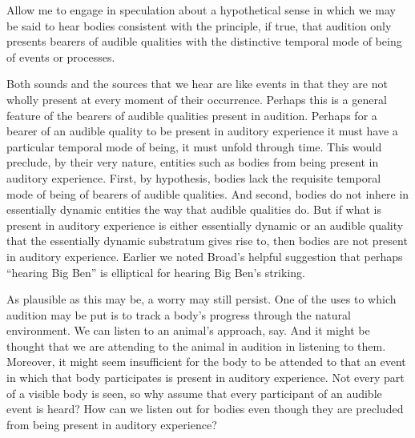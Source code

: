 \documentclass[12pt]{article}
\begin{document}

Allow me to engage in speculation about a hypothetical sense in which we may be said to hear bodies consistent with the principle, if true, that audition only presents bearers of audible qualities with the distinctive temporal mode of being of events or processes.

Both sounds and the sources that we hear are like events in that they are not wholly present at every moment of their occurrence. Perhaps this is a general feature of the bearers of audible qualities present in audition. Perhaps for a bearer of an audible quality to be present in auditory experience it must have a particular temporal mode of being, it must unfold through time. This would preclude, by their very nature, entities such as bodies from being present in auditory experience. First, by hypothesis, bodies lack the requisite temporal mode of being of bearers of audible qualities. And second, bodies do not inhere in essentially dynamic entities the way that audible qualities do. But if what is present in auditory experience is either essentially dynamic or an audible quality that the essentially dynamic substratum gives rise to, then bodies are not present in auditory experience. Earlier we noted Broad’s helpful suggestion that perhaps “hearing Big Ben” is elliptical for hearing Big Ben’s striking.

As plausible as this may be, a worry may still persist. One of the uses to which audition may be put is to track a body’s progress through the natural environment. We can listen to an animal’s approach, say. And it might be thought that we are attending to the animal in audition in listening to them. Moreover, it might seem insufficient for the body to be attended to that an event in which that body participates is present in auditory experience. Not every part of a visible body is seen, so why assume that every participant of an audible event is heard? How can we listen out for bodies even though they are precluded from being present in auditory experience?
\end{document}
